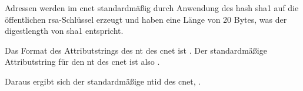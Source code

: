 Adressen werden im \gls{cnet} standardmäßig durch Anwendung des \gls{hash} \gls{sha1} auf die öffentlichen
\gls{rsa}-Schlüssel erzeugt und haben eine Länge von 20 Bytes, was der \gls{digestlength} von \gls{sha1}
entspricht.

Das Format des Attributstrings des \gls{nt} des \gls{cnet} ist
.
Der standardmäßige Attributstring für den \gls{nt} des \gls{cnet} ist also
\sloppy{\mbox{\code{\cnetattr}}}.

Daraus ergibt sich der standardmäßige \gls{ntid} des \gls{cnet},
\sloppy{\mbox{\code{\cnetid}}}.
